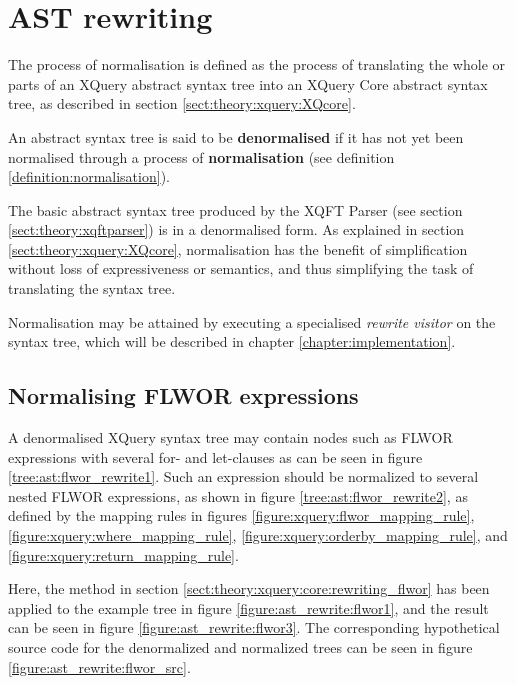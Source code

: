\section{AST rewriting}
\begin{myDefinition}
\label{definition:normalisation}
The process of normalisation is defined as the process of translating the
whole or parts of an XQuery abstract syntax tree into an XQuery Core abstract
syntax tree, as described in section \ref{sect:theory:xquery:XQcore}.
\end{myDefinition}

\begin{myDefinition}
\label{definition:denormalised}
An abstract syntax tree is said to be \textbf{denormalised} if it has not yet
been normalised through a process of \textbf{normalisation} (see definition
\ref{definition:normalisation}).
\end{myDefinition}

The basic abstract syntax tree produced by the XQFT Parser (see section
\ref{sect:theory:xqftparser}) is in a denormalised form. As explained in
section \ref{sect:theory:xquery:XQcore}, normalisation has the benefit of
simplification without loss of expressiveness or semantics, and thus simplifying
the task of translating the syntax tree.

Normalisation may be attained by executing a specialised \textit{rewrite
visitor} on the syntax tree, which will be described in chapter
\ref{chapter:implementation}.

\subsection{Normalising FLWOR expressions}
A denormalised XQuery syntax tree may contain nodes such as FLWOR expressions
 with several for- and let-clauses as can be seen in figure \ref{tree:ast:flwor_rewrite1}. Such an
expression should be normalized to several nested FLWOR expressions, as shown
in figure \ref{tree:ast:flwor_rewrite2}, as defined by the mapping rules in
figures \ref{figure:xquery:flwor_mapping_rule},
\ref{figure:xquery:where_mapping_rule},
\ref{figure:xquery:orderby_mapping_rule}, and
\ref{figure:xquery:return_mapping_rule}.

Here, the method in section \ref{sect:theory:xquery:core:rewriting_flwor} has
been applied to the example tree in figure \ref{figure:ast_rewrite:flwor1},
and the result can be seen in figure \ref{figure:ast_rewrite:flwor3}. The
corresponding hypothetical source code for the denormalized and normalized trees
can be seen in figure \ref{figure:ast_rewrite:flwor_src}.

